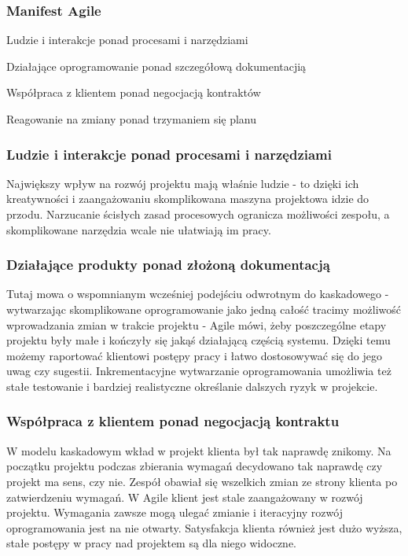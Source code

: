 \documentclass{article}
\begin{document}
\subsubsection{Manifest Agile}

\begin{center}
    Ludzie i interakcje ponad procesami i narzędziami

    Działające oprogramowanie ponad szczegółową dokumentacjią

    Współpraca z klientem ponad negocjacją kontraktów

    Reagowanie na zmiany ponad trzymaniem się planu\cite{manifesto}
\end{center}

\subsubsection*{Ludzie i interakcje ponad procesami i narzędziami}
Największy wpływ na rozwój projektu mają właśnie ludzie - to dzięki ich kreatywności i zaangażowaniu skomplikowana maszyna projektowa idzie do przodu. Narzucanie ścisłych zasad procesowych ogranicza możliwości zespołu, a skomplikowane narzędzia wcale nie ułatwiają im pracy.

\subsubsection*{Działające produkty ponad złożoną dokumentacją}
Tutaj mowa o wspomnianym wcześniej podejściu odwrotnym do kaskadowego - wytwarzając skomplikowane oprogramowanie jako jedną całość tracimy możliwość wprowadzania zmian w trakcie projektu - Agile mówi, żeby poszczególne etapy projektu były małe i kończyły się jakąś działającą częścią systemu. Dzięki temu możemy raportować klientowi postępy pracy i łatwo dostosowywać się do jego uwag czy sugestii. Inkrementacyjne wytwarzanie oprogramowania umożliwia też stałe testowanie i bardziej realistyczne określanie dalszych ryzyk w projekcie.

\subsubsection*{Współpraca z klientem ponad negocjacją kontraktu}
W modelu kaskadowym wkład w projekt klienta był tak naprawdę znikomy. Na początku projektu podczas zbierania wymagań decydowano tak naprawdę czy projekt ma sens, czy nie. Zespół obawiał się wszelkich zmian ze strony klienta po zatwierdzeniu wymagań. W Agile klient jest stale zaangażowany w rozwój projektu. Wymagania zawsze mogą ulegać zmianie i iteracyjny rozwój oprogramowania jest na nie otwarty. Satysfakcja klienta również jest dużo wyższa, stałe postępy w pracy nad projektem są dla niego widoczne.
\end{document}

